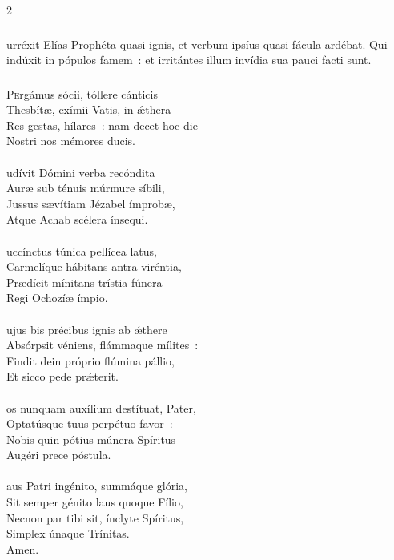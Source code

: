 \documentclass[9pt,twoside]{extarticle}
\begin{document}
\begin{multicols}{2}
{{{\subsubsection*{}
urréxit Elías Prophéta quasi ignis, et verbum ipsíus quasi fácula ardébat. Qui indúxit in pópulos famem~: et irritántes illum invídia sua pauci facti sunt.

\subsubsection*{\center {}}
\lettrine{P}ergámus sócii, tóllere cánticis\\
Thesbítæ, exímii Vatis, in ǽthera\\
Res gestas, hílares~: nam decet hoc die\\
Nostri nos mémores ducis.\\
\\
udívit Dómini verba recóndita\\
Auræ sub ténuis múrmure síbili,\\
Jussus sævítiam Jézabel ímprobæ,\\
Atque Achab scélera ínsequi.\\
\\
uccínctus túnica pellícea latus,\\
Carmelíque hábitans antra viréntia,\\
Prædícit mínitans trístia fúnera\\
Regi Ochozíæ ímpio.\\
\\
ujus bis précibus ignis ab ǽthere\\
Absórpsit véniens, flámmaque mílites~:\\
Findit dein próprio flúmina pállio,\\
Et sicco pede prǽterit.\\
\\
os nunquam auxílium destítuat, Pater,\\
Optatúsque tuus perpétuo favor~:\\
Nobis quin pótius múnera Spíritus\\
Augéri prece póstula.\\
\\
aus Patri ingénito, summáque glória,\\
Sit semper génito laus quoque Fílio,\\
Necnon par tibi sit, ínclyte Spíritus,\\
Simplex únaque Trínitas.\\
Amen.

}}}
\end{multicols}
\end{document}
